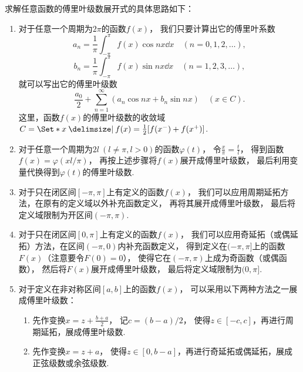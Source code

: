 求解任意函数的傅里叶级数展开式的具体思路如下：
\begin{enumerate}
\item 对于任意一个周期为\(2\pi\)的函数\(f(x)\)，%
我们只要计算出它的傅里叶系数\[
a_n = \frac{1}{\pi} \int_{-\pi}^{\pi} f(x) \cos nx \dd{x}
\quad(n=0,1,2,\dotsc),
\]\[
b_n = \frac{1}{\pi} \int_{-\pi}^{\pi} f(x) \sin nx \dd{x}
\quad(n=1,2,3,\dotsc),
\]就可以写出它的傅里叶级数\[
\frac{a_0}{2} + \sum\limits_{n=1}^\infty (a_n \cos nx + b_n \sin nx)
\quad(x \in C).
\]
这里，函数\(f(x)\)的傅里叶级数的收敛域\(C = \Set*{
	x \given
	f(x) = \frac{1}{2} [ f(x^-) + f(x^+) ]
}\).

\item 对于任意一个周期为\(2l\ (l\neq\pi,l>0)\)的函数\(\varphi(t)\)，%
令\(\frac{x}{\pi} = \frac{t}{l}\)，%
得到函数\(f(x) = \varphi(xl/\pi)\)，%
再按上述步骤将\(f(x)\)展开成傅里叶级数，%
最后利用变量代换得到\(\varphi(t)\)的傅里叶级数.

\item 对于只在闭区间\([-\pi,\pi]\)上有定义的函数\(f(x)\)，%
我们可以应用周期延拓方法，在原有的定义域以外补充函数定义，%
再将其展开成傅里叶级数，%
最后将定义域限制为开区间\((-\pi,\pi)\).

\item 对于只在闭区间\([0,\pi]\)上有定义的函数\(f(x)\)，%
我们可以应用奇延拓（或偶延拓）方法，在区间\((-\pi,0)\)内补充函数定义，%
得到定义在\((-\pi,\pi]\)上的函数\(F(x)\)（注意要令\(F(0) = 0\)），%
使得它在\((-\pi,\pi)\)上成为奇函数（或偶函数），%
然后将\(F(x)\)展开成傅里叶级数，%
最后将定义域限制为\((0,\pi]\).

\item 对于定义在非对称区间\([a,b]\)上的函数\(f(x)\)，%
可以采用以下两种方法之一展成傅里叶级数：
	\begin{enumerate}
		\item 先作变换\(x = z + \frac{b+a}{2}\)，%
		记\(c = (b-a)/2\)，%
		使得\(z\in[-c,c]\)，再进行周期延拓，展成傅里叶级数.
		\item 先作变换\(x = z + a\)，%
		使得\(z\in[0,b-a]\)，再进行奇延拓或偶延拓，展成正弦级数或余弦级数.
	\end{enumerate}
\end{enumerate}

\endgroup
